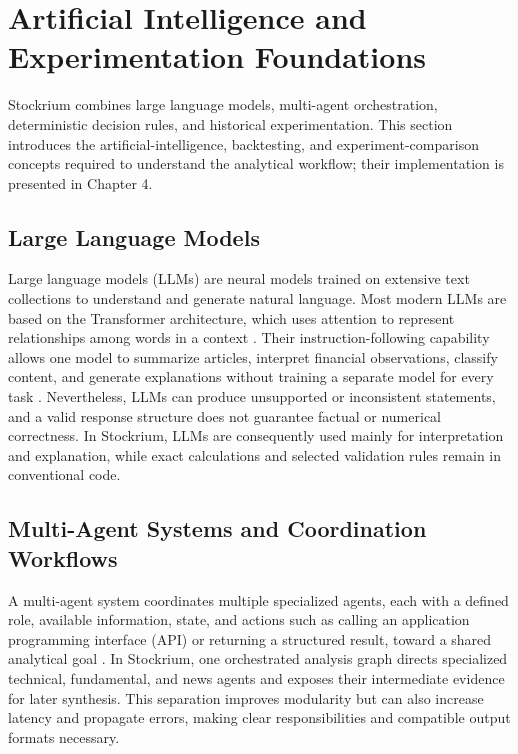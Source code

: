 \section{Artificial Intelligence and Experimentation Foundations}
\label{sec:artificial-intelligence-foundations}

Stockrium combines large language models, multi-agent orchestration, deterministic decision rules, and historical experimentation. This section introduces the artificial-intelligence, backtesting, and experiment-comparison concepts required to understand the analytical workflow; their implementation is presented in Chapter 4.

\subsection{Large Language Models}

Large language models (LLMs) are neural models trained on extensive text collections to understand and generate natural language. Most modern LLMs are based on the Transformer architecture, which uses attention to represent relationships among words in a context \cite{vaswani2017attention}. Their instruction-following capability allows one model to summarize articles, interpret financial observations, classify content, and generate explanations without training a separate model for every task \cite{brown2020gpt3}. Nevertheless, LLMs can produce unsupported or inconsistent statements, and a valid response structure does not guarantee factual or numerical correctness. In Stockrium, LLMs are consequently used mainly for interpretation and explanation, while exact calculations and selected validation rules remain in conventional code.

\subsection{Multi-Agent Systems and Coordination Workflows}

A multi-agent system coordinates multiple specialized agents, each with a defined role, available information, state, and actions such as calling an application programming interface (API) or returning a structured result, toward a shared analytical goal \cite{wooldridge2009multiagent}. In Stockrium, one orchestrated analysis graph directs specialized technical, fundamental, and news agents and exposes their intermediate evidence for later synthesis. This separation improves modularity but can also increase latency and propagate errors, making clear responsibilities and compatible output formats necessary.

